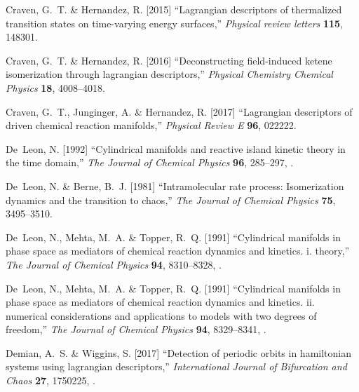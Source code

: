 \documentclass{ws-ijbc}
\begin{document}
\begin{thebibliography}{76}
	Craven, G.~T. \& Hernandez, R. [2015] \enquote{Lagrangian descriptors of
		thermalized transition states on time-varying energy surfaces,}
	\emph{Physical review letters} \textbf{115},  148301.
	
	Craven, G.~T. \& Hernandez, R. [2016] \enquote{Deconstructing field-induced
		ketene isomerization through lagrangian descriptors,} \emph{Physical
		Chemistry Chemical Physics} \textbf{18},  4008--4018.
	
	Craven, G.~T., Junginger, A. \& Hernandez, R. [2017] \enquote{Lagrangian
		descriptors of driven chemical reaction manifolds,} \emph{Physical Review E}
	\textbf{96},  022222.
	
	De~Leon, N. [1992] \enquote{Cylindrical manifolds and reactive island kinetic
		theory in the time domain,} \emph{The Journal of Chemical Physics}
	\textbf{96},  285--297, .
	
	De~Leon, N. \& Berne, B.~J. [1981] \enquote{Intramolecular rate process:
		{Isomerization} dynamics and the transition to chaos,} \emph{The Journal of
		Chemical Physics} \textbf{75},  3495--3510.
	
	De~Leon, N., Mehta, M.~A. \& Topper, R.~Q. [1991{}]
	\enquote{Cylindrical manifolds in phase space as mediators of chemical
		reaction dynamics and kinetics. i. theory,} \emph{The Journal of Chemical
		Physics} \textbf{94},  8310--8328, .
	
	De~Leon, N., Mehta, M.~A. \& Topper, R.~Q. [1991{}]
	\enquote{Cylindrical manifolds in phase space as mediators of chemical
		reaction dynamics and kinetics. ii. numerical considerations and applications
		to models with two degrees of freedom,} \emph{The Journal of Chemical
		Physics} \textbf{94},  8329--8341, .
	
	Demian, A.~S. \& Wiggins, S. [2017] \enquote{Detection of periodic orbits in
		hamiltonian systems using lagrangian descriptors,} \emph{International
		Journal of Bifurcation and Chaos} \textbf{27},  1750225,
	.
	

\end{thebibliography}
\end{document}
